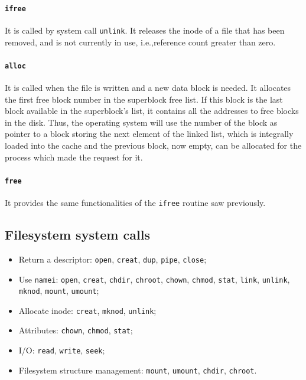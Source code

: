 \paragraph{\texttt{ifree}} It is called by system call \texttt{unlink}. It releases the inode of a file that has been removed, and is not currently in use, i.e.,\@ reference count greater than zero.

\paragraph{\texttt{alloc}} It is called when the file is written and a new data block is needed. It allocates the first free block number in the superblock free list. If this block is the last block available in the superblock's list, it contains all the addresses to free blocks in the disk. Thus, the operating system will use the number of the block as pointer to a block storing the next element of the linked list, which is integrally loaded into the cache and the previous block, now empty, can be allocated for the process which made the request for it.

\paragraph{\texttt{free}} It provides the same functionalities of the \texttt{ifree} routine saw previously.

\subsection{Filesystem system calls}
\begin{itemize}
\item Return a descriptor: \texttt{open}, \texttt{creat}, \texttt{dup}, \texttt{pipe}, \texttt{close};
\item Use \texttt{namei}: \texttt{open}, \texttt{creat}, \texttt{chdir}, \texttt{chroot}, \texttt{chown}, \texttt{chmod}, \texttt{stat}, \texttt{link}, \texttt{unlink}, \texttt{mknod}, \texttt{mount}, \texttt{umount};
\item Allocate inode: \texttt{creat}, \texttt{mknod}, \texttt{unlink};
\item Attributes: \texttt{chown}, \texttt{chmod}, \texttt{stat};
\item I/O: \texttt{read}, \texttt{write}, \texttt{seek};
\item Filesystem structure management: \texttt{mount}, \texttt{umount}, \texttt{chdir}, \texttt{chroot}.
\end{itemize}

